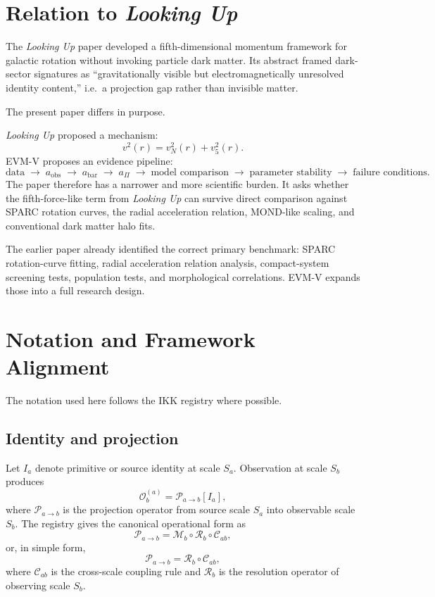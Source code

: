 \documentclass[11pt,a4paper,oneside]{article}
\newcommand{\Ia}{I_a}
\newcommand{\Osp}{\mathcal{O}_b}
\newcommand{\Pab}{\mathcal{P}_{a\to b}}
\newcommand{\aobs}{a_{\mathrm{obs}}}
\newcommand{\abar}{a_{\mathrm{bar}}}
\newcommand{\aPi}{a_{\Pi}}
\newcommand{\vN}{v_N}
\newcommand{\vfive}{v_5}
\begin{document}
\section{Relation to \emph{Looking Up}}

The \emph{Looking Up} paper developed a fifth-dimensional momentum framework for
galactic rotation without invoking particle dark matter. Its abstract framed dark-sector
signatures as ``gravitationally visible but electromagnetically unresolved identity
content,'' i.e.\ a projection gap rather than invisible matter.

The present paper differs in purpose.

\emph{Looking Up} proposed a mechanism:
\[
    v^2(r) = \vN^2(r) + \vfive^2(r).
\]
EVM-V proposes an evidence pipeline:
\[
    \text{data}
    \;\to\; \aobs
    \;\to\; \abar
    \;\to\; \aPi
    \;\to\; \text{model comparison}
    \;\to\; \text{parameter stability}
    \;\to\; \text{failure conditions.}
\]
The paper therefore has a narrower and more scientific burden. It asks whether the
fifth-force-like term from \emph{Looking Up} can survive direct comparison against
SPARC rotation curves, the radial acceleration relation, MOND-like scaling, and
conventional dark matter halo fits.

The earlier paper already identified the correct primary benchmark: SPARC
rotation-curve fitting, radial acceleration relation analysis, compact-system screening
tests, population tests, and morphological correlations. EVM-V expands those into a
full research design.

\section{Notation and Framework Alignment}

The notation used here follows the IKK registry where possible.

\subsection{Identity and projection}

Let $\Ia$ denote primitive or source identity at scale $S_a$. Observation at scale
$S_b$ produces
\[
    \Osp^{(a)} = \Pab[\Ia],
\]
where $\Pab$ is the projection operator from source scale $S_a$ into observable scale
$S_b$. The registry gives the canonical operational form as
\[
    \Pab = \mathcal{M}_b \circ \mathcal{R}_b \circ \mathcal{C}_{ab},
\]
or, in simple form,
\[
    \Pab = \mathcal{R}_b \circ \mathcal{C}_{ab},
\]
where $\mathcal{C}_{ab}$ is the cross-scale coupling rule and $\mathcal{R}_b$ is the
resolution operator of observing scale $S_b$.
\end{document}
